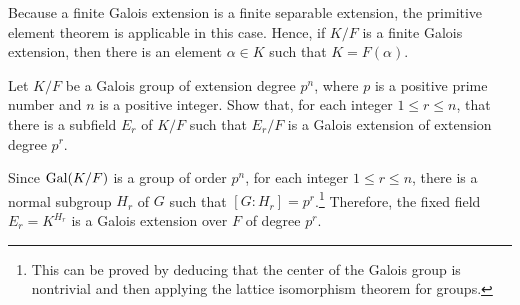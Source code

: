\begin{rmk}
    Because a finite Galois extension is a finite separable extension, the primitive element theorem is applicable in this case.
    Hence, if $K/F$ is a finite Galois extension, then there is an element $\alpha\in K$ such that $K=F(\alpha)$.
\end{rmk}

\begin{prob}
    Let $K/F$ be a Galois group of extension degree $p^n$, where $p$ is a positive prime number and $n$ is a positive integer.
    Show that, for each integer $1\leq r\leq n$, that there is a subfield $E_r$ of $K/F$ such that $E_r/F$ is a Galois extension of extension degree $p^r$.
\end{prob}
\begin{sol}
    Since ${\textrm{Gal}({K/F})}$ is a group of order $p^n$, for each integer $1\leq r\leq n$, there is a normal subgroup $H_r$ of $G$ such that $[G: H_r]=p^r$.\footnote{This can be proved by deducing that the center of the Galois group is nontrivial and then applying the lattice isomorphism theorem for groups.}
    Therefore, the fixed field $E_r=K^{H_r}$ is a Galois extension over $F$ of degree $p^r$.
\end{sol}

